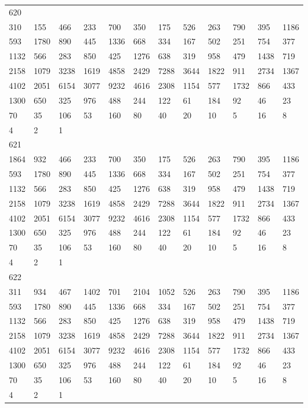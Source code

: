 \begin{longtable}{llllllllllll}
620&&&&&&&&&&&\\
310& 155& 466& 233& 700& 350& 175& 526& 263& 790& 395& 1186\\
593& 1780& 890& 445& 1336& 668& 334& 167& 502& 251& 754& 377\\
1132& 566& 283& 850& 425& 1276& 638& 319& 958& 479& 1438& 719\\
2158& 1079& 3238& 1619& 4858& 2429& 7288& 3644& 1822& 911& 2734& 1367\\
4102& 2051& 6154& 3077& 9232& 4616& 2308& 1154& 577& 1732& 866& 433\\
1300& 650& 325& 976& 488& 244& 122& 61& 184& 92& 46& 23\\
70& 35& 106& 53& 160& 80& 40& 20& 10& 5& 16& 8\\
4& 2& 1& \\

621&&&&&&&&&&&\\
1864& 932& 466& 233& 700& 350& 175& 526& 263& 790& 395& 1186\\
593& 1780& 890& 445& 1336& 668& 334& 167& 502& 251& 754& 377\\
1132& 566& 283& 850& 425& 1276& 638& 319& 958& 479& 1438& 719\\
2158& 1079& 3238& 1619& 4858& 2429& 7288& 3644& 1822& 911& 2734& 1367\\
4102& 2051& 6154& 3077& 9232& 4616& 2308& 1154& 577& 1732& 866& 433\\
1300& 650& 325& 976& 488& 244& 122& 61& 184& 92& 46& 23\\
70& 35& 106& 53& 160& 80& 40& 20& 10& 5& 16& 8\\
4& 2& 1& \\

622&&&&&&&&&&&\\
311& 934& 467& 1402& 701& 2104& 1052& 526& 263& 790& 395& 1186\\
593& 1780& 890& 445& 1336& 668& 334& 167& 502& 251& 754& 377\\
1132& 566& 283& 850& 425& 1276& 638& 319& 958& 479& 1438& 719\\
2158& 1079& 3238& 1619& 4858& 2429& 7288& 3644& 1822& 911& 2734& 1367\\
4102& 2051& 6154& 3077& 9232& 4616& 2308& 1154& 577& 1732& 866& 433\\
1300& 650& 325& 976& 488& 244& 122& 61& 184& 92& 46& 23\\
70& 35& 106& 53& 160& 80& 40& 20& 10& 5& 16& 8\\
4& 2& 1& \\


\end{longtable}
